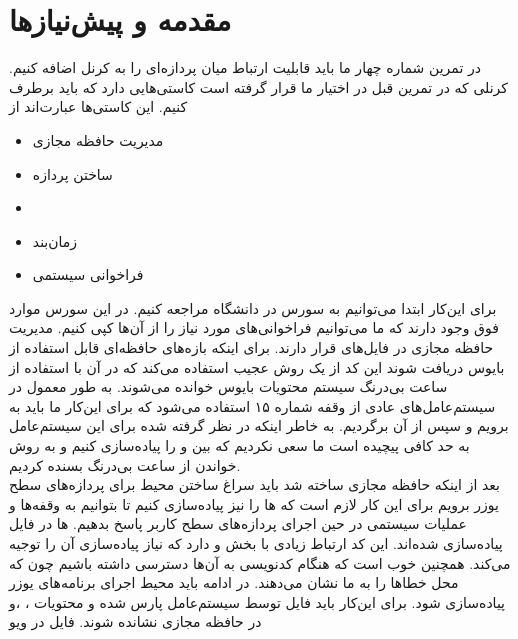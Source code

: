 \documentclass[a4paper, 12pt]{article}
\title{\lr{JOS IPC Implementation}}
\author{
    علی کریمی \and
    حسین افکار \and
    محمدرضا ولی
    }
\begin{document}
\maketitle
\section{
    مقدمه و پیش‌نیاز‌ها
}
در تمرین شماره چهار ما باید قابلیت ارتباط میان پردازه‌ای را به کرنل
اضافه کنیم.
کرنلی که در تمرین قبل در اختیار ما قرار گرفته است کاستی‌هایی دارد که باید برطرف کنیم.
این کاستی‌ها عبارت‌اند از
\begin{itemize}
    \item مدیریت حافظه مجازی
    \item ساختن پردازه
    \item {}
    \item زمان‌بند
    \item فراخوانی سیستمی 
\end{itemize}
برای این‌کار ابتدا می‌توانیم به سورس
در دانشگاه
مراجعه کنیم.
در این سورس موارد فوق وجود دارند که ما می‌توانیم فراخوانی‌های مورد نیاز را از آن‌ها کپی کنیم.
مدیریت حافظه مجازی در فایل‌های
قرار دارند.
برای اینکه بازه‌های حافظه‌ای قابل استفاده از بایوس دریافت شوند این کد از یک روش عجیب استفاده می‌کند
که در آن با استفاده از ساعت بی‌درنگ سیستم محتویات
بایوس خوانده می‌شوند.
به طور معمول در سیستم‌عامل‌های عادی از وقفه شماره ۱۵ استفاده می‌شود که برای این‌کار ما باید
به
برویم و سپس از آن برگردیم.
به خاطر اینکه
در نظر گرفته شده برای این سیستم‌عامل به حد کافی پیچیده است ما سعی نکردیم که
بین
و
را پیاده‌سازی کنیم و به روش خواندن از ساعت بی‌درنگ بسنده کردیم. \\
بعد از اینکه حافظه مجازی ساخته شد باید سراغ ساختن محیط برای پردازه‌های سطح یوزر برویم
برای این کار لازم است که
ها را نیز پیاده‌سازی کنیم تا بتوانیم به وقفه‌ها و عملیات سیستمی در حین اجرای پردازه‌های سطح‌ کاربر پاسخ
بدهیم.
ها در فایل
پیاده‌سازی شده‌اند.
این کد ارتباط زیادی با بخش
و
دارد که نیاز پیاده‌سازی آن را توجیه می‌کند. همچنین خوب است که هنگام کدنویسی
به آن‌ها دسترسی داشته باشیم چون که محل خطا‌ها را به ما نشان می‌دهند.
در ادامه باید محیط اجرای برنامه‌های یوزر پیاده‌سازی شود.
برای این‌کار باید فایل
توسط سیستم‌عامل پارس شده و محتویات
،
،و 
در حافظه مجازی نشانده شوند.
فایل
در ویو
\end{document}

